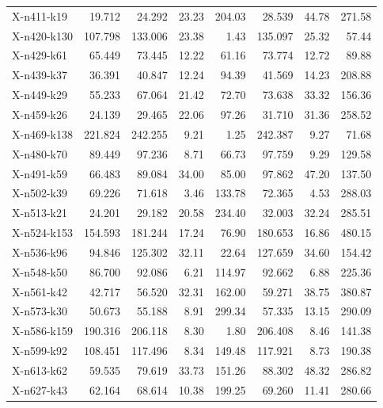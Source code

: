 \begin{longtable}{@{}lrrrrrrr@{}}
X-n411-k19   &     19.712 &      24.292 &  23.23 & 204.03 &      28.539 &  44.78 & 271.58 \\
X-n420-k130  &    107.798 &     133.006 &  23.38 &   1.43 &     135.097 &  25.32 &  57.44 \\
X-n429-k61   &     65.449 &      73.445 &  12.22 &  61.16 &      73.774 &  12.72 &  89.88 \\
X-n439-k37   &     36.391 &      40.847 &  12.24 &  94.39 &      41.569 &  14.23 & 208.88 \\
X-n449-k29   &     55.233 &      67.064 &  21.42 &  72.70 &      73.638 &  33.32 & 156.36 \\
X-n459-k26   &     24.139 &      29.465 &  22.06 &  97.26 &      31.710 &  31.36 & 258.52 \\
X-n469-k138  &    221.824 &     242.255 &   9.21 &   1.25 &     242.387 &   9.27 &  71.68 \\
X-n480-k70   &     89.449 &      97.236 &   8.71 &  66.73 &      97.759 &   9.29 & 129.58 \\
X-n491-k59   &     66.483 &      89.084 &  34.00 &  85.00 &      97.862 &  47.20 & 137.50 \\
X-n502-k39   &     69.226 &      71.618 &   3.46 & 133.78 &      72.365 &   4.53 & 288.03 \\
X-n513-k21   &     24.201 &      29.182 &  20.58 & 234.40 &      32.003 &  32.24 & 285.51 \\
X-n524-k153  &    154.593 &     181.244 &  17.24 &  76.90 &     180.653 &  16.86 & 480.15 \\
X-n536-k96   &     94.846 &     125.302 &  32.11 &  22.64 &     127.659 &  34.60 & 154.42 \\
X-n548-k50   &     86.700 &      92.086 &   6.21 & 114.97 &      92.662 &   6.88 & 225.36 \\
X-n561-k42   &     42.717 &      56.520 &  32.31 & 162.00 &      59.271 &  38.75 & 380.87 \\
X-n573-k30   &     50.673 &      55.188 &   8.91 & 299.34 &      57.335 &  13.15 & 290.09 \\
X-n586-k159  &    190.316 &     206.118 &   8.30 &   1.80 &     206.408 &   8.46 & 141.38 \\
X-n599-k92   &    108.451 &     117.496 &   8.34 & 149.48 &     117.921 &   8.73 & 190.38 \\
X-n613-k62   &     59.535 &      79.619 &  33.73 & 151.26 &      88.302 &  48.32 & 286.82 \\
X-n627-k43   &     62.164 &      68.614 &  10.38 & 199.25 &      69.260 &  11.41 & 280.66 \\

\end{longtable}
